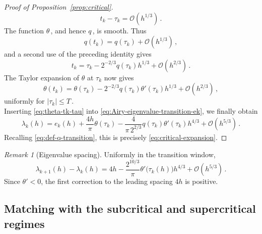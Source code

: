 \documentclass[11pt]{amsart}
\numberwithin{equation}{section}
\theoremstyle{remark}
\newtheorem{remark}[theorem]{Remark}
\begin{document}
\begin{proof}[Proof of Proposition~\ref{prop:critical}]
	\begin{equation}\label{eq:tk-tau-first}
		t_k-\tau_k=\mathcal O(h^{1/3})\,.
	\end{equation}
	The function $\theta\,$, and hence $q\,$, is smooth. Thus
	\[
	q(t_k)=q(\tau_k)+\mathcal O(h^{1/3})\,,
	\]
	and a second use of the preceding identity gives
	\begin{equation}\label{eq:tk-tau-refined}
		t_k
		=
		\tau_k
		-
		2^{-2/3}q(\tau_k)h^{1/3}
		+
		\mathcal O(h^{2/3})\,.
	\end{equation}
	The Taylor expansion of $\theta$ at $\tau_k$ now gives
	\begin{equation}\label{eq:theta-tk-tau}
		\theta(t_k)
		=
		\theta(\tau_k)
		-
		2^{-2/3}q(\tau_k)\theta'(\tau_k)h^{1/3}
		+
		\mathcal O(h^{2/3})\,,
	\end{equation}
	uniformly for $|\tau_k|\leq T\,$.\\
	Inserting
	\eqref{eq:theta-tk-tau} into
	\eqref{eq:Airy-eigenvalue-transition-ek}, we finally obtain
	\[
	\lambda_k(h)
	=
	e_k(h)
	+
	\frac{4h}{\pi}\theta(\tau_k)
	-
	\frac{4}{\pi\,2^{2/3}}
	q(\tau_k)\theta'(\tau_k)h^{4/3}
	+
	\mathcal O(h^{5/3})\,.
	\]
	Recalling \eqref{eq:def-q-transition}, this is precisely
	\eqref{eq:critical-expansion}.
\end{proof}















\begin{remark}[Eigenvalue spacing]
	Uniformly in the transition window,
	\[
	\lambda_{k+1}(h)-\lambda_k(h)
	=
	4h
	-\frac{2^{10/3}}{\pi}
	\theta'\bigl(\tau_k(h)\bigr)h^{4/3}
	+\mathcal O(h^{5/3})\,.
	\]
	Since $\theta'<0$, the first correction to the leading spacing
	$4h$ is positive.
\end{remark}





\subsection{Matching with the subcritical and supercritical regimes}\label{subsec:matching}
\end{document}
